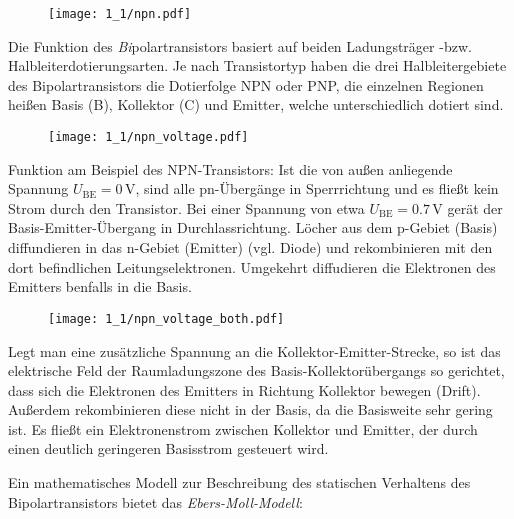 \begin{figure}[H]
\begin{center}
  \texttt{[image: 1\_1/npn.pdf]}
  \end{center}
\end{figure}

Die Funktion des \emph{Bi}polartransistors basiert auf beiden Ladungsträger
-bzw. Halbleiterdotierungsarten. Je nach Transistortyp haben die drei Halbleitergebiete des Bipolartransistors die Dotierfolge NPN oder PNP, die einzelnen Regionen heißen Basis (B), Kollektor (C) und Emitter, welche unterschiedlich dotiert sind.\\

\begin{figure}[H]
\begin{center}
  \texttt{[image: 1\_1/npn\_voltage.pdf]}
  \end{center}
\end{figure}
Funktion am Beispiel des NPN-Transistors:
Ist die von außen anliegende Spannung $U_{\textrm{BE}}= 0\, \si{\volt}$, sind alle pn-Übergänge in Sperrrichtung und es fließt kein Strom durch den Transistor. Bei einer Spannung von etwa $U_{\textrm{BE}}=0.7\,\si{\volt}$ gerät der Basis-Emitter-Übergang in Durchlassrichtung. Löcher aus dem p-Gebiet (Basis) diffundieren in das n-Gebiet (Emitter) (vgl. Diode) und rekombinieren mit den dort befindlichen Leitungselektronen. Umgekehrt diffudieren die Elektronen des Emitters benfalls in die Basis. \\

\begin{figure}[H]
\begin{center}
  \texttt{[image: 1\_1/npn\_voltage\_both.pdf]}
  \end{center}
\end{figure}
Legt man eine zusätzliche Spannung an die Kollektor-Emitter-Strecke, so ist das elektrische Feld der Raumladungszone des Basis-Kollektorübergangs so gerichtet, dass sich die Elektronen des Emitters in Richtung Kollektor bewegen (Drift). Außerdem rekombinieren diese nicht in der Basis, da die Basisweite sehr gering ist. Es fließt ein Elektronenstrom zwischen Kollektor und Emitter, der durch einen deutlich geringeren Basisstrom gesteuert wird.


Ein mathematisches Modell zur Beschreibung des statischen Verhaltens des Bipolartransistors bietet das \emph{Ebers-Moll-Modell}:

